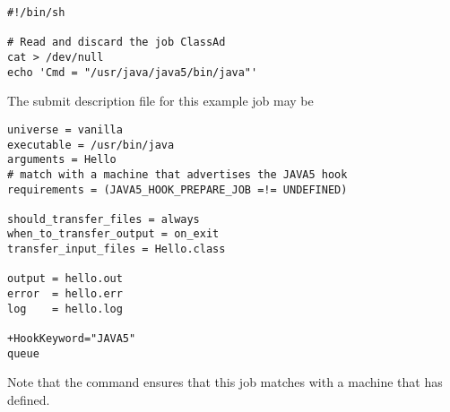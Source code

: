 \begin{verbatim}
#!/bin/sh

# Read and discard the job ClassAd
cat > /dev/null
echo 'Cmd = "/usr/java/java5/bin/java"'
\end{verbatim}

The submit description file for this example job may be
\footnotesize
\begin{verbatim}
universe = vanilla
executable = /usr/bin/java
arguments = Hello
# match with a machine that advertises the JAVA5 hook
requirements = (JAVA5_HOOK_PREPARE_JOB =!= UNDEFINED)

should_transfer_files = always
when_to_transfer_output = on_exit
transfer_input_files = Hello.class

output = hello.out
error  = hello.err
log    = hello.log

+HookKeyword="JAVA5"
queue

\end{verbatim}
\normalsize
Note that the  command ensures that this job
matches with a machine that has  defined.

